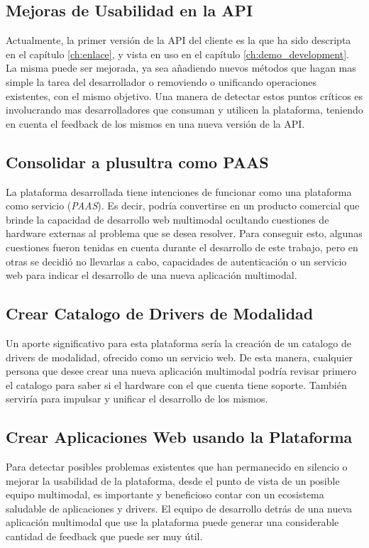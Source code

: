 \subsection{Mejoras de Usabilidad en la API}
Actualmente, la primer versión de la API del cliente es la que ha sido descripta en el capítulo \ref{ch:enlace}, y vista en uso en el capítulo \ref{ch:demo_development}. La misma puede ser mejorada, ya sea añadiendo nuevos métodos que hagan mas simple la tarea del desarrollador o removiendo o unificando operaciones existentes, con el mismo objetivo. Una manera de detectar estos puntos críticos es involucrando mas desarrolladores que consuman y utilicen la plataforma, teniendo en cuenta el feedback de los mismos en una nueva versión de la API.

\subsection{Consolidar a plusultra como PAAS}
La plataforma desarrollada tiene intenciones de funcionar como una plataforma como servicio (\emph{PAAS}). Es decir, podría convertirse en un producto comercial que brinde la capacidad de desarrollo web multimodal ocultando cuestiones de hardware externas al problema que se desea resolver. Para conseguir esto, algunas cuestiones fueron tenidas en cuenta durante el desarrollo de este trabajo, pero en otras se decidió no llevarlas a cabo, \eg capacidades de autenticación o un servicio web para indicar el desarrollo de una nueva aplicación multimodal.

\subsection{Crear Catalogo de Drivers de Modalidad}
Un aporte significativo para esta plataforma sería la creación de un catalogo de drivers de modalidad, ofrecido como un servicio web. De esta manera, cualquier persona que desee crear una nueva aplicación multimodal podría revisar primero el catalogo para saber si el hardware con el que cuenta tiene soporte. También serviría para impulsar y unificar el desarrollo de los mismos.

\subsection{Crear Aplicaciones Web usando la Plataforma}
Para detectar posibles problemas existentes que han permanecido en silencio o mejorar la usabilidad de la plataforma, desde el punto de vista de un posible equipo multimodal, es importante y beneficioso contar con un ecosistema saludable de aplicaciones y drivers. El equipo de desarrollo detrás de una nueva aplicación multimodal que use la plataforma puede generar una considerable cantidad de feedback que puede ser muy útil.

